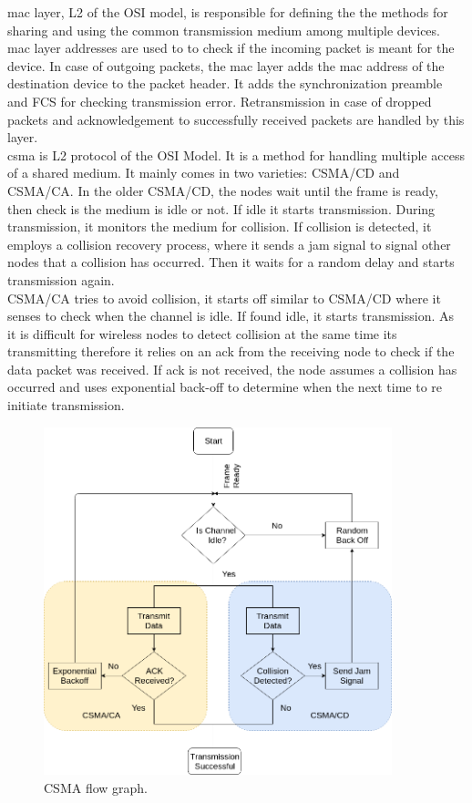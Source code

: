 \ac{mac} layer, \ac{L2} of the \ac{OSI} model, is responsible for defining the the methods for sharing and using the common transmission medium among multiple devices.
\ac{mac} layer addresses are used to to check if the incoming packet is meant for the device.
In case of outgoing packets, the \ac{mac} layer adds the \ac{mac} address of the destination device to the packet header.
It adds the synchronization preamble and \ac{FCS} for checking transmission error.
Retransmission in case of dropped packets and acknowledgement to successfully received packets are handled by this layer.\\

\ac{csma} is \ac{L2} protocol of the OSI Model. 
It is a method for handling multiple access of a shared medium.
It mainly comes in two varieties: \ac{CSMA/CD}  and \ac{CSMA/CA}. In the older \ac{CSMA/CD}, the nodes wait until the frame is ready, then check is the medium is idle or not.
If idle it starts transmission.
During transmission, it monitors the medium for collision.
If collision is detected, it employs a collision recovery process, where it sends a jam signal to signal other nodes that a collision has occurred.
Then it waits for a  random delay and starts transmission again.\\

\ac{CSMA/CA} tries to avoid collision, it starts off similar to \ac{CSMA/CD} where it senses to check when the channel is idle.
If found idle, it starts transmission.
As it is difficult for wireless nodes to detect collision at the same time its transmitting therefore it relies on an \ac{ack} from the receiving node to check if the data packet was received.
If \ac{ack} is not received, the node assumes a collision has occurred and  uses exponential back-off to determine when the next time to re initiate transmission.\\
\begin{figure}[h!]
\label{Csma_flow}
\centering
\includegraphics[width=0.9\textwidth]{Figure/CSMA.png}
\caption{CSMA flow graph.}
\end{figure}

